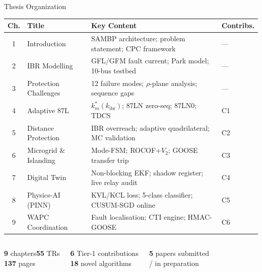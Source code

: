\documentclass[aspectratio=169, 10pt]{beamer}
\newcommand{\kibr}{k_{\mathrm{ibr}}}
\begin{document}
\begin{frame}{Thesis Organization}
  \vspace{0.15cm}
  \begin{center}
  \small
  \begin{tabular}{@{}clp{7.2cm}l@{}}
    \toprule
    \textbf{Ch.} & \textbf{Title} & \textbf{Key Content} & \textbf{Contribs.}\\
    \midrule
    \rowcolor{iitmMaroon!8}
    1 & Introduction           & SAMBP architecture; problem statement; CPC framework & ---\\
    2 & IBR Modelling          & GFL/GFM fault current; Park model; 10-bus testbed & ---\\
    \rowcolor{iitmMaroon!8}
    3 & Protection Challenges  & 12 failure modes; $\rho$-plane analysis; sequence gaps & ---\\
    4 & Adaptive 87L           & $k_m^*(\kibr)$; 87LN zero-seq; 87LN0; TDCS & C1\\
    \rowcolor{iitmMaroon!8}
    5 & Distance Protection    & IBR overreach; adaptive quadrilateral; MC validation & C2\\
    6 & Microgrid \& Islanding & Mode-FSM; ROCOF+$V_2$; GOOSE transfer trip & C3\\
    \rowcolor{iitmMaroon!8}
    7 & Digital Twin           & Non-blocking EKF; shadow register; live relay audit & C4\\
    8 & Physics-AI (PINN)      & KVL/KCL loss; 5-class classifier; CUSUM-SGD online & C5\\
    \rowcolor{iitmMaroon!8}
    9 & WAPC Coordination      & Fault localisation; CTI engine; HMAC-GOOSE & C6\\
    \bottomrule
  \end{tabular}
  \end{center}
  \vspace{0.1cm}
  \begin{columns}[T]
      \begin{tcolorbox}[keyfact]
        \scriptsize\centering
        \textbf{9} chapters\quad\textbf{55} TRs\\
        \textbf{137} pages
      \end{tcolorbox}
      \begin{tcolorbox}[result]
        \scriptsize\centering
        \textbf{6} Tier-1 contributions\\
        \textbf{18} novel algorithms
      \end{tcolorbox}
      \begin{tcolorbox}[alert2]
        \scriptsize\centering
        \textbf{5} papers submitted\\
        / in preparation
      \end{tcolorbox}
  \end{columns}


\end{frame}
\end{document}
